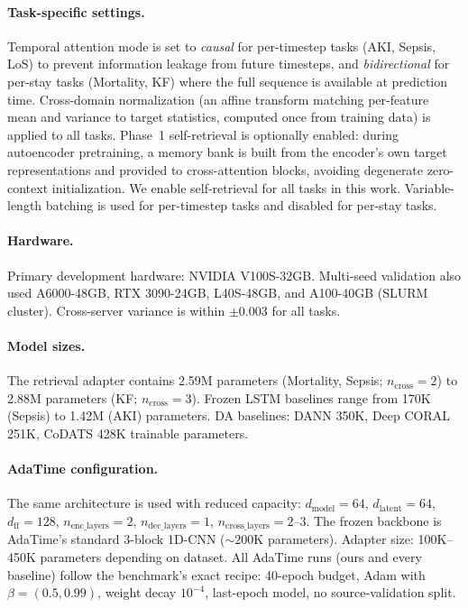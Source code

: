 \paragraph{Task-specific settings.}
Temporal attention mode is set to \emph{causal} for per-timestep tasks (AKI, Sepsis, LoS) to prevent information leakage from future timesteps, and \emph{bidirectional} for per-stay tasks (Mortality, KF) where the full sequence is available at prediction time.
Cross-domain normalization (an affine transform matching per-feature mean and variance to target statistics, computed once from training data) is applied to all tasks.
Phase~1 self-retrieval is optionally enabled: during autoencoder pretraining, a memory bank is built from the encoder's own target representations and provided to cross-attention blocks, avoiding degenerate zero-context initialization. We enable self-retrieval for all tasks in this work.
Variable-length batching is used for per-timestep tasks and disabled for per-stay tasks.

\paragraph{Hardware.}
Primary development hardware: NVIDIA V100S-32GB.
Multi-seed validation also used A6000-48GB, RTX 3090-24GB, L40S-48GB, and A100-40GB (SLURM cluster).
Cross-server variance is within $\pm$0.003 \aucroc{} for all tasks.

\paragraph{Model sizes.}
The retrieval adapter contains 2.59M parameters (Mortality, Sepsis; $n_\text{cross}=2$) to 2.88M parameters (KF; $n_\text{cross}=3$).
Frozen LSTM baselines range from 170K (Sepsis) to 1.42M (AKI) parameters.
DA baselines: DANN 350K, Deep CORAL 251K, CoDATS 428K trainable parameters.

\paragraph{AdaTime configuration.}
The same \retr{} architecture is used with reduced capacity: $d_\text{model}=64$, $d_\text{latent}=64$, $d_\text{ff}=128$, $n_\text{enc\_layers}=2$, $n_\text{dec\_layers}=1$, $n_\text{cross\_layers}=2$--$3$.
The frozen backbone is AdaTime's standard 3-block 1D-CNN ($\sim$200K parameters).
Adapter size: 100K--450K parameters depending on dataset.
All AdaTime runs (ours and every baseline) follow the benchmark's exact recipe: 40-epoch budget, Adam with $\beta=(0.5, 0.99)$, weight decay $10^{-4}$, last-epoch model, no source-validation split.

